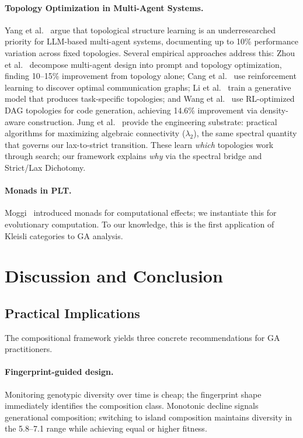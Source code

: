 \documentclass[sigconf]{acmart}
\begin{document}
\paragraph{Topology Optimization in Multi-Agent Systems.}
Yang et al.~\cite{yang2025topology} argue that topological structure learning is an underresearched priority for LLM-based multi-agent systems, documenting up to 10\% performance variation across fixed topologies. Several empirical approaches address this: Zhou et al.~\cite{zhou2025mass} decompose multi-agent design into prompt and topology optimization, finding 10--15\% improvement from topology alone; Cang et al.~\cite{cang2026graphgrpo} use reinforcement learning to discover optimal communication graphs; Li et al.~\cite{li2026ofamas} train a generative model that produces task-specific topologies; and Wang et al.~\cite{wang2026agentconductor} use RL-optimized DAG topologies for code generation, achieving 14.6\% improvement via density-aware construction. Jung et al.~\cite{jung2025mac} provide the engineering substrate: practical algorithms for maximizing algebraic connectivity ($\lambda_2$), the same spectral quantity that governs our lax-to-strict transition. These learn \emph{which} topologies work through search; our framework explains \emph{why} via the spectral bridge and Strict/Lax Dichotomy.

\paragraph{Monads in PLT.}
Moggi~\cite{moggi1991notions} introduced monads for computational effects; we instantiate this for evolutionary computation. To our knowledge, this is the first application of Kleisli categories to GA analysis.

\section{Discussion and Conclusion}

\subsection{Practical Implications}

The compositional framework yields three concrete recommendations for GA practitioners.

\paragraph{Fingerprint-guided design.}
Monitoring genotypic diversity over time is cheap; the fingerprint shape immediately identifies the composition class. Monotonic decline signals generational composition; switching to island composition maintains diversity in the 5.8--7.1 range while achieving equal or higher fitness.
\end{document}

